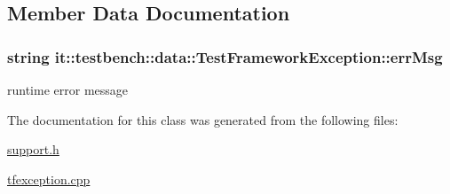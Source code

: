 \subsection{Member Data Documentation}
\hypertarget{classit_1_1testbench_1_1data_1_1TestFrameworkException_aa7d40a46be76ef920df2862a54bee6bb}{
\subsubsection[{err\-Msg}]{\setlength{\rightskip}{0pt plus 5cm}string it\-::testbench\-::data\-::\-Test\-Framework\-Exception\-::err\-Msg\hspace{0.3cm}{\ttfamily [private]}}}\label{d4/dfe/classit_1_1testbench_1_1data_1_1TestFrameworkException_aa7d40a46be76ef920df2862a54bee6bb}
runtime error message 

The documentation for this class was generated from the following files\-:\begin{DoxyCompactItemize}
\item 
\hyperlink{support_8h}{support.\-h}\item 
\hyperlink{tfexception_8cpp}{tfexception.\-cpp}\end{DoxyCompactItemize}
